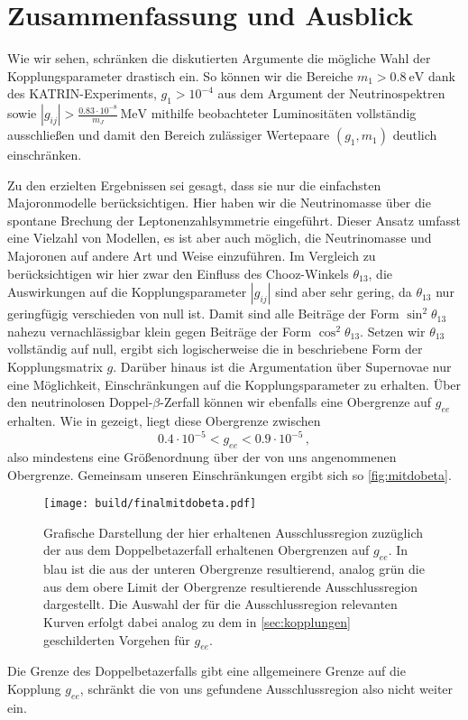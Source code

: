 \chapter{Zusammenfassung und Ausblick}

Wie wir sehen, schränken die diskutierten Argumente die mögliche Wahl der Kopplungsparameter drastisch ein.
So können wir die Bereiche $m_1 > \SI{0.8}{\eV}$ dank des KATRIN-Experiments, $g_1 > 10^{-4}$ aus dem Argument der Neutrinospektren sowie $|g_{i j}| > \frac{\num{0.83} \cdot 10^{-8}}{m_J} \,\si{\mega\eV}$
mithilfe beobachteter Luminositäten vollständig ausschließen und damit den Bereich zulässiger Wertepaare
$(g_1,m_1)$ deutlich einschränken.

Zu den erzielten Ergebnissen sei gesagt, dass sie nur die einfachsten Majoronmodelle berücksichtigen.
Hier haben wir die Neutrinomasse über die spontane Brechung der Leptonenzahlsymmetrie eingeführt.
Dieser Ansatz umfasst eine Vielzahl von Modellen, es ist aber auch möglich, die Neutrinomasse und Majoronen auf andere Art und Weise einzuführen.
Im Vergleich zu \cite{päspaper} berücksichtigen wir hier zwar den Einfluss des Chooz-Winkels $\theta_{1 3}$, die Auswirkungen auf die Kopplungsparameter $|g_{i j}|$ sind aber sehr gering, da $\theta_{13}$ nur geringfügig verschieden von null ist.
Damit sind alle Beiträge der Form $\sin^2 \theta_{13}$ nahezu vernachlässigbar klein gegen Beiträge der Form $\cos^2\theta_{13}$.
Setzen wir $\theta_{13}$ vollständig auf null, ergibt sich logischerweise die in \cite{päspaper} beschriebene Form der Kopplungsmatrix $g$.
Darüber hinaus ist die Argumentation über Supernovae nur eine Möglichkeit, Einschränkungen auf die Kopplungsparameter zu erhalten.
Über den neutrinolosen Doppel-$\beta$-Zerfall können wir ebenfalls eine Obergrenze auf $g_{ee}$ erhalten.
Wie in \cite{hauhau} gezeigt, liegt diese Obergrenze zwischen
\begin{equation}
    \num{0.4} \cdot 10^{-5} < g_{ee} < \num{0.9} \cdot 10^{-5} \,,
    \label{eq:g_eedoppelbeta}
\end{equation} 
also mindestens eine Größenordnung über der von uns angenommenen Obergrenze.
Gemeinsam unseren Einschränkungen ergibt sich so \autoref{fig:mitdobeta}.
\begin{figure}[H]
    \centering
    \texttt{[image: build/finalmitdobeta.pdf]}
    \caption{Grafische Darstellung der hier erhaltenen Ausschlussregion zuzüglich der aus dem Doppelbetazerfall erhaltenen Obergrenzen auf $g_{ee}$. In blau ist die aus der unteren Obergrenze resultierend, 
    analog grün die aus dem obere Limit der Obergrenze resultierende Ausschlussregion dargestellt. Die Auswahl der für die Ausschlussregion relevanten Kurven erfolgt dabei analog zu dem in \autoref{sec:kopplungen}
    geschilderten Vorgehen für $g_{ee}$.}
    \label{fig:mitdobeta}
\end{figure}
Die Grenze des Doppelbetazerfalls gibt eine allgemeinere Grenze auf die Kopplung $g_{ee}$, schränkt die von uns gefundene Ausschlussregion also nicht weiter ein.

